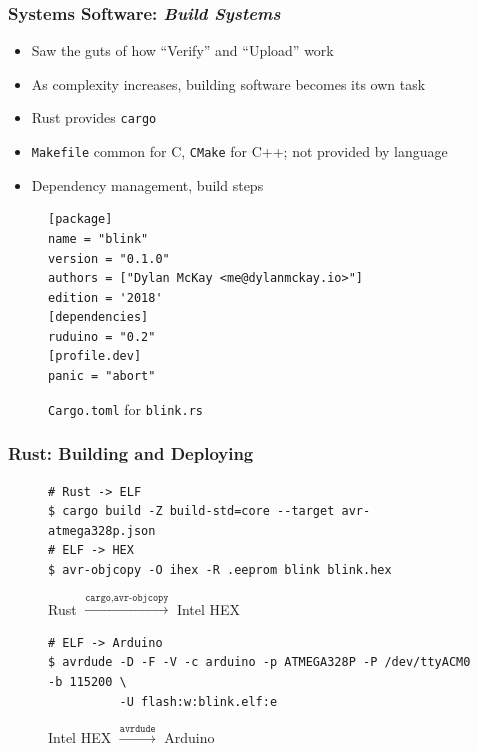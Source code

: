 \documentclass{beamer} \usetheme{Madrid}
\begin{document}
\begin{frame}[fragile]
    \frametitle{Systems Software: \emph{Build Systems}}
    \begin{itemize}
        \item Saw the guts of how ``Verify'' and ``Upload'' work
        \item As complexity increases, building software becomes its own task
        \item Rust provides \texttt{cargo}
        \item \texttt{Makefile} common for C, \texttt{CMake} for C++; not provided by language
        \item Dependency management, build steps
    \end{itemize}
    \begin{figure}
    \begin{verbatim}
[package]
name = "blink"
version = "0.1.0"
authors = ["Dylan McKay <me@dylanmckay.io>"]
edition = '2018'
[dependencies]
ruduino = "0.2"
[profile.dev]
panic = "abort"
    \end{verbatim}
    \caption{\texttt{Cargo.toml} for \texttt{blink.rs}}
    \end{figure}
\end{frame}

\begin{frame}[fragile]
    \frametitle{Rust: Building and Deploying}
    \begin{figure}
        \begin{verbatim}
# Rust -> ELF
$ cargo build -Z build-std=core --target avr-atmega328p.json
# ELF -> HEX
$ avr-objcopy -O ihex -R .eeprom blink blink.hex
        \end{verbatim}
        \caption{Rust $\xrightarrow{\texttt{cargo,avr-objcopy}}$ Intel HEX}
    \end{figure}
    \begin{figure}
        \begin{verbatim}
# ELF -> Arduino
$ avrdude -D -F -V -c arduino -p ATMEGA328P -P /dev/ttyACM0 -b 115200 \
          -U flash:w:blink.elf:e
        \end{verbatim}
        \caption{Intel HEX $\xrightarrow{\texttt{avrdude}}$ Arduino}
    \end{figure}
\end{frame}
\end{document}
